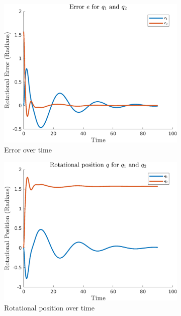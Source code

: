 \documentclass{article}
\begin{document}
\begin{figure}[H]
    \centering
    \begin{subfigure}{0.325\textwidth}
        \centering
        \includegraphics[width = \textwidth]{figures/error-b1.png}
        \caption{Error over time}
    \end{subfigure}
    \begin{subfigure}{0.325\textwidth}
        \centering
        \includegraphics[width = \textwidth]{figures/rotational-position-b1.png}
        \caption{Rotational position over time}
    \end{subfigure}
    \begin{subfigure}{0.325\textwidth}

\end{subfigure}
\end{figure}
\end{document}
